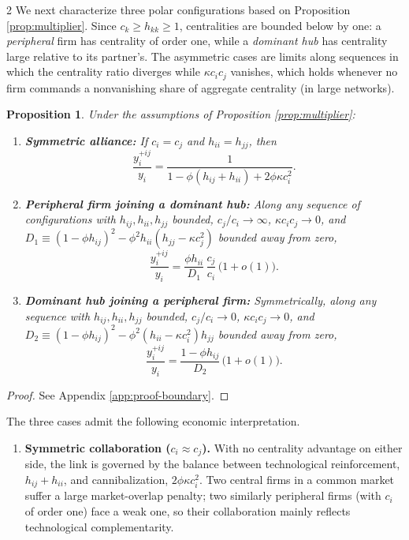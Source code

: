 \documentclass[12pt]{article}
\newtheorem{proposition}[claim]{Proposition}
\begin{document}
\begin{spacing}{2}
We next characterize three polar configurations based on Proposition \ref{prop:multiplier}. Since $c_k \ge h_{kk} \ge 1$, centralities are bounded below by one: a \emph{peripheral} firm has centrality of order one, while a
\emph{dominant hub} has centrality large relative to its partner's. The asymmetric cases are limits along sequences in which the centrality ratio diverges while $\kappa c_i c_j$ vanishes, which holds whenever no firm commands a nonvanishing share of aggregate centrality (in large networks).
\begin{proposition}%
\label{prop:boundary}
Under the assumptions of Proposition \ref{prop:multiplier}:
\begin{enumerate}
\item[(i)] \textbf{Symmetric alliance:} If $c_i = c_j$ and $h_{ii} = h_{jj}$, then
\begin{equation*}
\frac{y_i^{+ij}}{y_i} = \frac{1}{1 - \phi\left( h_{ij} + h_{ii} \right) + 2\phi\kappa c_i^2}.
\end{equation*}
\item[(ii)] \textbf{Peripheral firm joining a dominant hub:} Along any sequence of configurations with $h_{ij}, h_{ii}, h_{jj}$ bounded, $c_j/c_i \to \infty$, $\kappa c_i c_j \to 0$, and $D_1 \equiv (1-\phi h_{ij})^2 - \phi^2 h_{ii}(h_{jj} - \kappa c_j^2)$ bounded away from zero,
\begin{equation*}
\frac{y_i^{+ij}}{y_i} = \frac{\phi h_{ii}}{D_1}\,\frac{c_j}{c_i}\,\bigl( 1 + o(1) \bigr).
\end{equation*}
\item[(iii)] \textbf{Dominant hub joining a peripheral firm:} Symmetrically, along any sequence with $h_{ij}, h_{ii}, h_{jj}$ bounded, $c_j/c_i \to 0$, $\kappa c_i c_j \to 0$, and $D_2 \equiv (1-\phi h_{ij})^2 - \phi^2 (h_{ii} - \kappa c_i^2) h_{jj}$ bounded away from zero,
\begin{equation*}
\frac{y_i^{+ij}}{y_i} = \frac{1 - \phi h_{ij}}{D_2}\,\bigl( 1 + o(1) \bigr).
\end{equation*}
\end{enumerate}
\end{proposition}
\begin{proof}
See Appendix \ref{app:proof-boundary}.
\end{proof}
\noindent The three cases admit the following economic interpretation.
\begin{enumerate}
    \item \textbf{Symmetric collaboration ($c_i \approx c_j$).} With no centrality advantage on either side, the link is governed by the balance between technological reinforcement, $h_{ij}+h_{ii}$, and cannibalization, $2\phi\kappa c_i^2$. Two central firms in a common market suffer a large market-overlap penalty; two similarly peripheral firms (with $c_i$ of order one) face a weak one, so their collaboration mainly reflects technological complementarity.

\end{enumerate}
\end{spacing}
\end{document}
